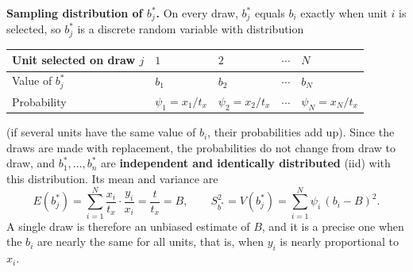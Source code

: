 \documentclass[
  letterpaper,
  DIV=11,
  numbers=noendperiod]{scrreprt}
\newcounter{none} %
\renewcommand{\[}{\begin{equation}}
\renewcommand{\]}{\end{equation}}
\begin{document}
\textbf{Sampling distribution of \(b_j^*\).} On every draw, \(b_j^*\)
equals \(b_i\) exactly when unit \(i\) is selected, so \(b_j^*\) is a
discrete random variable with distribution

{\def\LTcaptype{none} %
\begin{longtable}[]{@{}
  >{\raggedright\arraybackslash}p{}
  >{\centering\arraybackslash}p{}
  >{\centering\arraybackslash}p{}
  >{\centering\arraybackslash}p{}
  >{\centering\arraybackslash}p{}@{}}
\toprule\noalign{}
\begin{minipage}[b]{\linewidth}\raggedright
Unit selected on draw \(j\)
\end{minipage} & \begin{minipage}[b]{\linewidth}\centering
\(1\)
\end{minipage} & \begin{minipage}[b]{\linewidth}\centering
\(2\)
\end{minipage} & \begin{minipage}[b]{\linewidth}\centering
\(\cdots\)
\end{minipage} & \begin{minipage}[b]{\linewidth}\centering
\(N\)
\end{minipage} \\
\midrule\noalign{}
\endhead
\bottomrule\noalign{}
\endlastfoot
Value of \(b_j^*\) & \(b_1\) & \(b_2\) & \(\cdots\) & \(b_N\) \\
Probability & \(\psi_1=x_1/t_x\) & \(\psi_2=x_2/t_x\) & \(\cdots\) &
\(\psi_N=x_N/t_x\) \\
\end{longtable}
}

(if several units have the same value of \(b_i\), their probabilities
add up). Since the draws are made with replacement, the probabilities do
not change from draw to draw, and \(b_1^*,\ldots,b_n^*\) are
\textbf{independent and identically distributed} (iid) with this
distribution. Its mean and variance are \[
E(b_j^*)=\sum_{i=1}^N\frac{x_i}{t_x}\cdot\frac{y_i}{x_i}=\frac{t}{t_x}=B,\qquad
S_{b^*}^2=V(b_j^*)=\sum_{i=1}^N\psi_i\,(b_i-B)^2 .
\] A single draw is therefore an unbiased estimate of \(B\), and it is a
precise one when the \(b_i\) are nearly the same for all units, that is,
when \(y_i\) is nearly proportional to \(x_i\).
\end{document}
